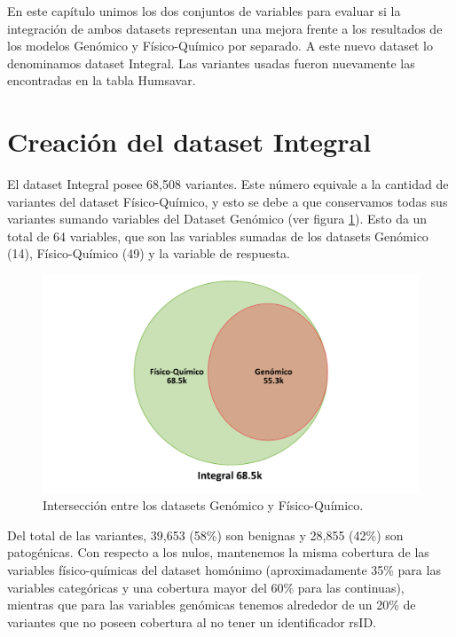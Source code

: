
En este capítulo unimos los dos conjuntos de variables para evaluar si la integración de ambos datasets representan una mejora frente a los resultados de los modelos Genómico y Físico-Químico por separado. A este nuevo dataset lo denominamos dataset Integral. Las variantes usadas fueron nuevamente las encontradas en la tabla Humsavar. 

\section{Creación del dataset Integral}

El dataset Integral posee 68,508 variantes. Este número equivale a la cantidad de variantes del dataset Físico-Químico, y esto se debe a que conservamos todas sus variantes sumando variables del Dataset Genómico (ver figura \ref{fig:interseccion_integral}). Esto da un total de 64 variables, que son las variables sumadas de los datasets Genómico (14), Físico-Químico (49) y la variable de respuesta.  

\begin{figure}[H]
    \centering
    \includegraphics[scale=0.6]{documents/latex/figures/3/integral/interseccion_integral.pdf}
    \caption{Intersección entre los datasets Genómico y Físico-Químico.}
    \label{fig:interseccion_integral}
\end{figure}

Del total de las variantes, 39,653 (58\%) son benignas y 28,855 (42\%) son patogénicas. Con respecto a los nulos, mantenemos la misma cobertura de las variables físico-químicas del dataset homónimo (aproximadamente 35\% para las variables categóricas y una cobertura mayor del 60\% para las continuas), mientras que para las variables genómicas tenemos alrededor de un 20\% de variantes que no poseen cobertura al no tener un identificador rsID.

